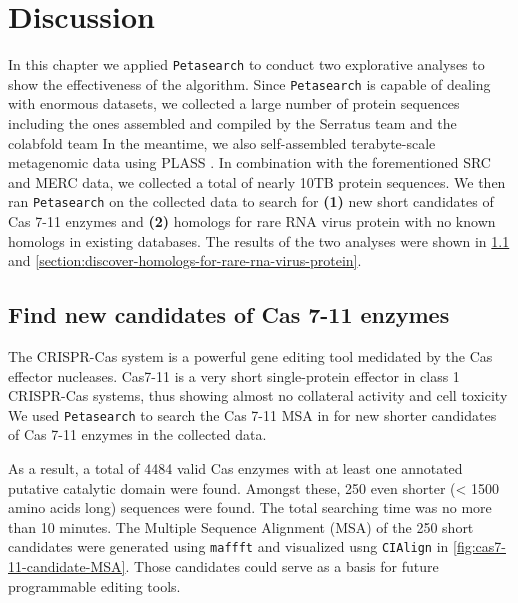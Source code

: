 \chapter{Discussion} \label{chapter:discussion}




In this chapter we applied \texttt{Petasearch} to conduct two explorative analyses to show the effectiveness of the algorithm. Since \texttt{Petasearch} is capable of dealing with enormous datasets, we collected a large number of protein sequences including the ones assembled and compiled by the Serratus team %
and the colabfold team %
In the meantime, we also self-assembled terabyte-scale metagenomic data using PLASS \cite{steinegger2019plass}. In combination with the forementioned SRC and MERC data, we collected a total of nearly 10TB protein sequences. We then ran \texttt{Petasearch} on the collected data to search for \textbf{(1)} new short candidates of Cas 7-11 enzymes and \textbf{(2)} homologs for rare RNA virus protein with no known homologs in existing databases. The results of the two analyses were shown in \cref{section:find-new-candidates-of-cas-7-11-enzymes} and \cref{section:discover-homologs-for-rare-rna-virus-protein}.

\section{Find new candidates of Cas 7-11 enzymes} \label{section:find-new-candidates-of-cas-7-11-enzymes}

The CRISPR-Cas system is a powerful gene editing tool medidated by the Cas effector nucleases. Cas7-11 is a very short single-protein effector in class 1 CRISPR-Cas systems, thus showing almost no collateral activity and cell toxicity %
We used \texttt{Petasearch} to search the Cas 7-11 MSA in %
for new shorter candidates of Cas 7-11 enzymes in the collected data.

As a result, a total of 4484 valid Cas enzymes with at least one annotated putative catalytic domain were found. Amongst these, 250 even shorter (< 1500 amino acids long) sequences were found. The total searching time was no more than 10 minutes. The Multiple Sequence Alignment (MSA) of the 250 short candidates were generated using \texttt{maffft} and visualized usng \texttt{CIAlign} in \cref{fig:cas7-11-candidate-MSA}. Those candidates could serve as a basis for future programmable editing tools.

